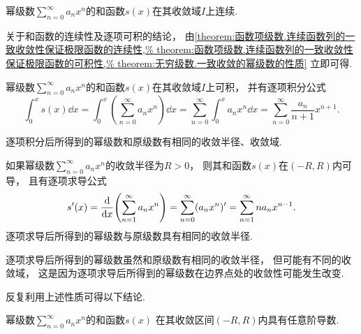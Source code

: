 \begin{property}\label{theorem:无穷级数.幂级数的和函数的性质1}
幂级数\(\sum_{n=0}^\infty a_n x^n\)的和函数\(s(x)\)在其收敛域\(I\)上连续.
\end{property}

关于和函数的连续性及逐项可积的结论，
由\cref{theorem:函数项级数.连续函数列的一致收敛性保证极限函数的连续性,%
theorem:函数项级数.连续函数列的一致收敛性保证极限函数的可积性,%
theorem:无穷级数.一致收敛的幂级数的性质}
立即可得.

\begin{property}\label{theorem:无穷级数.幂级数的和函数的性质2}
幂级数\(\sum_{n=0}^\infty a_n x^n\)的和函数\(s(x)\)在其收敛域\(I\)上可积，
并有逐项积分公式\begin{equation}
	\int_0^x s(x) \dd{x}
	=\int_0^x \left(\sum_{n=0}^\infty a_n x^n\right) \dd{x}
	=\sum_{n=0}^\infty \int_0^x a_n x^n \dd{x}
	=\sum_{n=0}^\infty \frac{a_n}{n+1} x^{n+1}.
\end{equation}

逐项积分后所得到的幂级数和原级数有相同的收敛半径、收敛域.
\end{property}

\begin{property}\label{theorem:无穷级数.幂级数的和函数的性质3}
如果幂级数\(\sum_{n=0}^\infty a_n x^n\)的收敛半径为\(R>0\)，
则其和函数\(s(x)\)在\((-R,R)\)内可导，
且有逐项求导公式\begin{equation}
	s'(x)
	= \dv{x}( \sum_{n=1}^\infty a_n x^n )
	= \sum_{n=0}^\infty (a_n x^n)'
	= \sum_{n=1}^\infty n a_n x^{n-1}.
\end{equation}
逐项求导后所得到的幂级数与原级数具有相同的收敛半径.
\end{property}
逐项求导后所得到的幂级数虽然和原级数有相同的收敛半径，
但可能有不同的收敛域，
这是因为逐项求导后所得到的幂级数在边界点处的收敛性可能发生改变.

反复利用上述性质可得以下结论.
\begin{proposition}
幂级数\(\sum_{n=0}^\infty a_n x^n\)的和函数\(s(x)\)
在其收敛区间\((-R,R)\)内具有任意阶导数.
\end{proposition}

